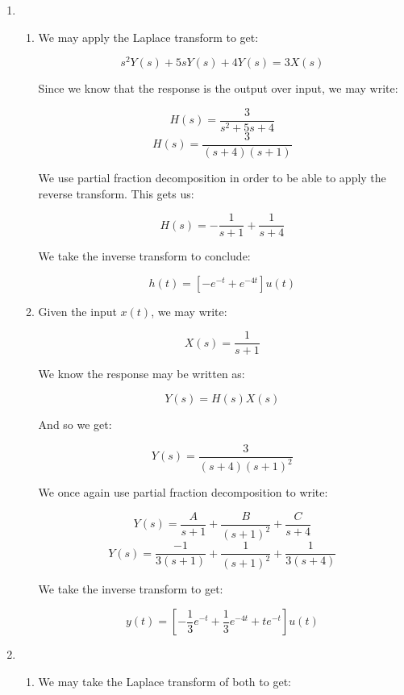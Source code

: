 \begin{enumerate}
\begin{enumerate}
    \end{enumerate}

  \item

    \begin{enumerate}

      \item We may apply the Laplace transform to get:

        $$s^2Y(s)+5sY(s)+4Y(s)=3X(s)$$

        Since we know that the response is the output over input, we may write:

        $$H(s)=\frac{3}{s^2+5s+4}$$
        $$H(s)=\frac{3}{(s+4)(s+1)}$$

        We use partial fraction decomposition in order to be able to apply the reverse transform. This gets us:

        $$H(s)=-\frac{1}{s+1}+\frac{1}{s+4}$$

        We take the inverse transform to conclude:

        $$\boxed{h(t)=[-e^{-t}+e^{-4t}]u(t)}$$

      \item Given the input $x(t)$, we may write:

        $$X(s)=\frac{1}{s+1}$$

        We know the response may be written as:

        $$Y(s)=H(s)X(s)$$

        And so we get:

        $$Y(s)=\frac{3}{(s+4)(s+1)^2}$$

        We once again use partial fraction decomposition to write:

        $$Y(s)=\frac{A}{s+1}+\frac{B}{(s+1)^2}+\frac{C}{s+4}$$
        $$Y(s)=\frac{-1}{3(s+1)}+\frac{1}{(s+1)^2}+\frac{1}{3(s+4)}$$

        We take the inverse transform to get:

        $$\boxed{y(t)=\left[-\frac{1}{3}e^{-t}+\frac{1}{3}e^{-4t}+te^{-t}\right]u(t)}$$

    \end{enumerate}

    \setcounter{enumi}{7}

  \item

    \begin{enumerate}

      \item We may take the Laplace transform of both to get:


\end{enumerate}
\end{enumerate}
